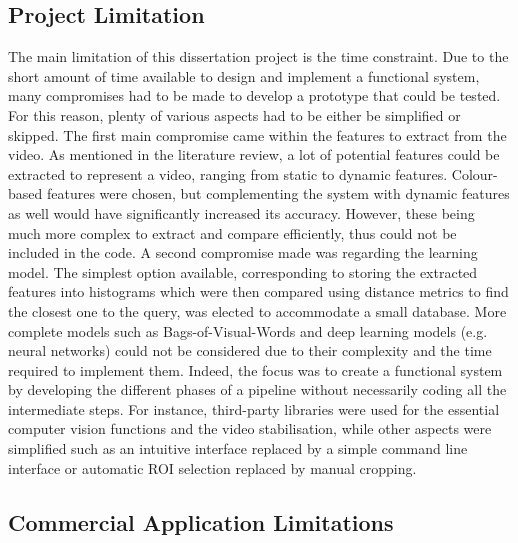 \subsection{Project Limitation}

The main limitation of this dissertation project is the time constraint. Due to the short amount of time available to design and implement a functional system, many compromises had to be made to develop a prototype that could be tested. For this reason, plenty of various aspects had to be either be simplified or skipped. The first main compromise came within the features to extract from the video. As mentioned in the literature review, a lot of potential features could be extracted to represent a video, ranging from static to dynamic features. Colour-based features were chosen, but complementing the system with dynamic features as well would have significantly increased its accuracy. However, these being much more complex to extract and compare efficiently, thus could not be included in the code. A second compromise made was regarding the learning model. The simplest option available, corresponding to storing the extracted features into histograms which were then compared using distance metrics to find the closest one to the query, was elected to accommodate a small database. More complete models such as Bags-of-Visual-Words and deep learning models (e.g. neural networks) could not be considered due to their complexity and the time required to implement them. Indeed, the focus was to create a functional system by developing the different phases of a pipeline without necessarily coding all the intermediate steps. For instance, third-party libraries were used for the essential computer vision functions and the video stabilisation, while other aspects were simplified such as an intuitive interface replaced by a simple command line interface or automatic ROI selection replaced by manual cropping.

\subsection{Commercial Application Limitations}


